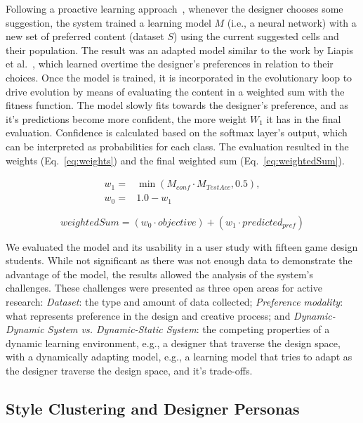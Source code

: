 Following a proactive learning approach~\cite{donmez2008proactive}, whenever the designer chooses some suggestion, the system trained a learning model $M$ (i.e., a neural network) with a new set of preferred content (dataset $S$) using the current suggested cells and their population. The result was an adapted model similar to the work by Liapis et al.~\cite{Liapis2012-adaptiveVisual}, which learned overtime the designer's preferences in relation to their choices. Once the model is trained, it is incorporated in the evolutionary loop to drive evolution by means of evaluating the content in a weighted sum with the fitness function. The model slowly fits towards the designer’s preference, and as it's predictions become more confident, the more weight $W_{1}$ it has in the final evaluation. Confidence is calculated based on the softmax layer's output, which can be interpreted as probabilities for each class. The evaluation resulted in the weights (Eq.~\ref{eq:weights}) and the final weighted sum (Eq.~\ref{eq:weightedSum}).

\begin{equation} \label{eq:weights}
\begin{split}
 w_{1}={}&\min(M_{conf} \cdot M_{TestAcc}, 0.5),\\
w_{0} ={}& 1.0 - w_{1}   
\end{split}
\end{equation}

\begin{equation} \label{eq:weightedSum}
weightedSum = (w_{0} \cdot objective) + (w_{1} \cdot predicted_{pref})
\end{equation}

We evaluated the model and its usability in a user study with fifteen game design students. While not significant as there was not enough data to demonstrate the advantage of the model, the results allowed the analysis of the system's challenges. These challenges were presented as three open areas for active research: \textit{Dataset}: the type and amount of data collected; \textit{Preference modality}: what represents preference in the design and creative process; and \textit{Dynamic-Dynamic System vs. Dynamic-Static System}: the competing properties of a dynamic learning environment, e.g., a designer that traverse the design space, with a dynamically adapting model, e.g., a learning model that tries to adapt as the designer traverse the design space, and it's trade-offs.

\subsection{Style Clustering and Designer Personas}

